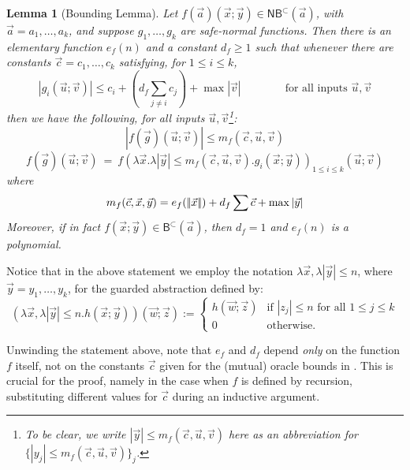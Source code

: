\documentclass[manuscript,screen]{acmart}
\newcommand{\red}[1]{{\color{red}#1}}
\newcommand{\anupam}[1]{\todo{A: #1}}
\newtheorem{lem}[thm]{Lemma}
\theoremstyle{definition}
\theoremstyle{remark}
\newcommand{\permpref}{\subset}
\newcommand{\sumlen}[1]{|\hspace{-.15em}|#1|\hspace{-.15em}|}
\newcommand{\bc}{\mathsf{B}}
\newcommand{\bcwfpo}[1]{\bc^{#1}}
\newcommand{\nested}{\mathsf{N}}
\newcommand{\nbcwfpo}[1]{\nested\bcwfpo{#1}}
\newcommand{\bcpp}{\bcwfpo{\permpref}}
\newcommand{\nbcpp}{\nbcwfpo{\permpref}}
\begin{document}
\begin{lem}[Bounding Lemma]
\label{lem:boundinglemma}
Let $f(\vec a)(\vec x;\vec y) \in \nbcpp(\vec a)$, with $\vec a = a_1, \dots, a_k$, and suppose $g_1, \ldots, g_k$ are safe-normal functions. Then there is an elementary function $e_f(n)$ and a constant $d_f \geq 1$ such that whenever there are constants $\vec c=c_1, \dots, c_k$ satisfying, for $1\leq i \leq k$,
\begin{equation}
    \label{eq:oracle-const-max-bound}
    |g_i (\vec u;\vec v)| \leq c_i + \left(d_f \sum_{j\neq i} c_j \right) + \max|\vec v| \qquad \qquad \text{for all inputs } \vec u,\vec v
\end{equation}
then we have the following, for all inputs $\vec u, \vec v$\footnote{To be clear,  we write $|\vec y| \leq m_f(\vec c,\vec u,\vec v)  $ here as an abbreviation for $\{|y_{j}| \leq m_f(\vec c,\vec u,\vec v)\}_j$.}:
\begin{equation}
    \label{eq:elem-const-max-bound}
    |f(\vec g)(\vec u;\vec v)| \leq m_f(\vec c, \vec u,\vec v)
\end{equation}
\begin{equation}
    \label{eq:input-bounding-eqn}
    f(\vec g)(\vec u; \vec v) \ = \ f\left(\lambda \vec x.\lambda |\vec y| \leq m_f(\vec c, \vec u,\vec v) . g_i(\vec x;\vec y)\right)_{1 \leq i \leq k}(\vec u;\vec v)
\end{equation}
where 
\[
m_f(\vec c,\vec x,\vec y) = 
e_f(\sumlen{\vec x}) + d_f\sum\vec c + \max |\vec y|
\]
Moreover, if in fact $f(\vec x;\vec y) \in \bcpp(\vec a) $, then $d_f=1$ and $e_f(n)$ is a polynomial. 
\end{lem}

Notice that in the above statement we employ the notation $\lambda \vec x, \lambda|\vec y|\leq n$, where $\vec y=y_1, \ldots, y_k$, for the guarded abstraction defined by:
\[
(\lambda \vec x, \lambda|\vec y|\leq n. h(\vec x; \vec y))(\vec w; \vec z):= \begin{cases}
    h(\vec w; \vec z) &\text{if } |z_j|\leq n \text{ for all }1 \leq j \leq k\\
    0 &\text{otherwise.}
\end{cases}
\]


Unwinding the statement above, note that $e_f$ and $d_f$ depend \emph{only} on the function $f$ itself, not on the constants $\vec c$ given for the (mutual) oracle bounds in .
This is crucial for the proof, namely in the case when $f$ is defined by recursion, substituting different values for $\vec c$ during an inductive argument.
\end{document}
